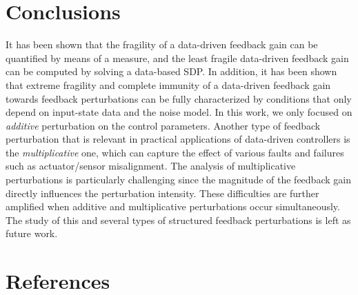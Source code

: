 \documentclass[9pt,shortpaper,twoside,web]{ieeecolor}
\begin{document}
\section{Conclusions}
\label{sec:V}

It has been shown that the fragility of a data-driven feedback gain can be quantified by means of a measure, and the least fragile data-driven feedback gain can be computed by solving a data-based SDP. In addition, it has been shown that extreme fragility and complete immunity of a data-driven feedback gain towards feedback perturbations can be fully characterized by conditions that only depend on input-state data and the noise model. In this work, we only focused on \emph{additive} perturbation on the control parameters. Another type of feedback perturbation that is relevant in practical applications of data-driven controllers is the \emph{multiplicative} one, which can capture the effect of various faults and failures such as actuator/sensor misalignment. The analysis of multiplicative perturbations is particularly challenging since the magnitude of the feedback gain directly influences the perturbation intensity. These difficulties are further amplified when additive and multiplicative perturbations occur simultaneously. The study of this and several types of structured feedback perturbations is left as future work. 

%

\section*{References}



%
\end{document}

